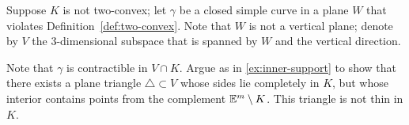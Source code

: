 %
%
%
%
%


Suppose $K$ is not two-convex;
let $\gamma$ be a closed simple curve in a plane $W$ that violates Definition~\ref{def:two-convex}.
Note that $W$ is not a vertical plane;
denote by $V$ the 3-dimensional subspace that is spanned by $W$ and the vertical direction.

Note that $\gamma$ is contractible in $V\cap K$.
Argue as in \ref{ex:inner-support} to show that there exists a plane triangle $\triangle\subset V$ whose sides lie completely in $K$,
but whose interior contains points from the complement $\mathbb{E}^m\setminus K$.
This triangle is not thin in $K$.

